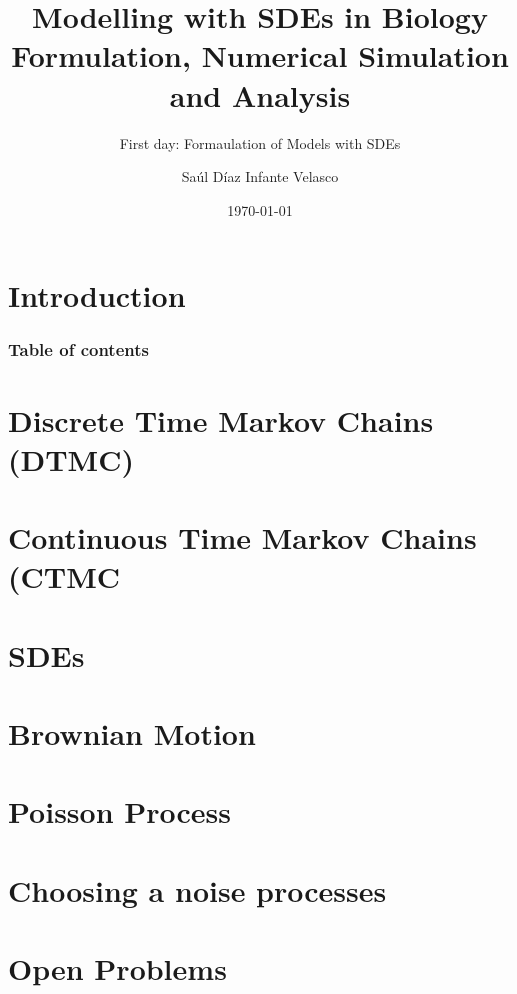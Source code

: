 \documentclass[9pt]{beamer}
\title{Modelling with SDEs in Biology\\
    Formulation, Numerical Simulation and Analysis}
\subtitle{First day: Formaulation of Models with SDEs}
\author{Saúl Díaz Infante Velasco}
\institute{CONACYT-UNIVERSIDAD de SONORA, Cimat, Guanajuato Gto}
\date{\today}
\begin{document}
    \titlepage
    \section{Introduction}
        
    \begin{frame}
        \frametitle{Table of contents}
        \tableofcontents
    \end{frame}
    \section{Discrete Time Markov Chains (DTMC)}
        
        
        
%
%        
    \section{Continuous Time Markov Chains (CTMC}
        
    \section{SDEs}
        
    \section{Brownian Motion}
    
    \section{Poisson Process}
    \section{Choosing a noise processes}
    \section{Open Problems}
\end{document}
